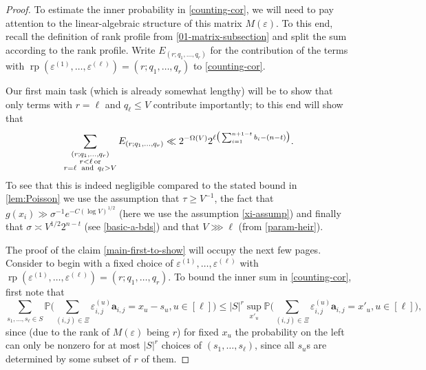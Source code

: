 \documentclass[11pt,reqno]{amsart}
\numberwithin{equation}{section}
\theoremstyle{definition}
\theoremstyle{remark}
\newcommand{\mb}{\mathbb}
\newcommand{\mbf}{\mathbf}
\newcommand{\eps}{\varepsilon}
\newcommand\rp{\operatorname{rp}}
\renewcommand{\le}{\leqslant}
\renewcommand{\ge}{\geqslant}
\begin{document}
\begin{proof}
To estimate the inner probability in \cref{counting-cor}, we will need to pay attention to the linear-algebraic structure of this matrix $M(\eps)$. To this end, recall the definition of rank profile from \cref{01-matrix-subsection} and split the sum according to the rank profile. Write $E_{(r; q_1,\dots, q_r)}$ for the contribution of the terms with $\rp(\eps^{(1)},\dots, \eps^{(\ell)})= (r; q_1,\dots, q_r)$ to \cref{counting-cor}. 

Our first main task (which is already somewhat lengthy) will be to show that only terms with $r = \ell$ and $q_{\ell} \le V$ contribute importantly; to this end will show that 
\begin{equation}\label{main-first-to-show} \sum_{\substack{(r; q_1,\dots, q_r) \\ r < \ell \mbox{\,\scriptsize or} \\ r = \ell \mbox{\, \scriptsize and \,} q_{\ell} > V}} E_{(r; q_1, \dots, q_r)} \ll 2^{-\Omega(V)} 2^{\ell \big(\sum_{i =1}^{n + 1 - t} b_i - (n - t) \big)}.\end{equation}
To see that this is indeed negligible compared to the stated bound in \cref{lem:Poisson} we use the assumption that $\tau \ge V^{-1}$, the fact that $g(x_i) \gg \sigma^{-1} e^{-C (\log V)^{1/2}}$ (here we use the assumption \cref{xi-assump}) and finally that $\sigma \asymp V^{1/2} 2^{n - t}$ (see \cref{basic-a-bds}) and that $V \ggg \ell$ (from \cref{param-heir}).


The proof of the claim \cref{main-first-to-show} will occupy the next few pages. 
Consider to begin with a fixed choice of $\eps^{(1)},\dots, \eps^{(\ell)}$ with $\rp(\eps^{(1)},\dots, \eps^{(\ell)}) = (r; q_1,\dots, q_r)$. To bound the inner sum in \cref{counting-cor}, first note that 
\begin{equation}\label{remove-sum-s} \sum_{s_1,\dots, s_{\ell} \in S} \mb{P} \Big(\sum_{(i,j) \in \Xi} \eps^{(u)}_{i,j} \mbf{a}_{i,j} = x_u - s_u, u \in [\ell]\Big) \le |S|^r \sup_{x'_u} \mb{P}\Big(\sum_{(i,j) \in \Xi} \eps^{(u)}_{i,j} \mbf{a}_{i,j} = x'_u, u \in [\ell]\Big), \end{equation} since (due to the rank of $M(\eps)$ being $r$) for fixed $x_u$ the probability on the left can only be nonzero for at most $|S|^r$ choices of $(s_1,\dots, s_{\ell})$, since all $s_u$s are determined by some subset of $r$ of them.


\end{proof}
\end{document}
